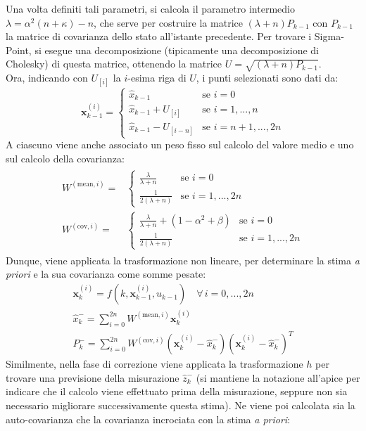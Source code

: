 \documentclass[12pt,a4paper,openright,twoside]{book}
\begin{document}
Una volta definiti tali parametri, si calcola il parametro intermedio $\lambda=\alpha^2(n+\kappa)-n$, che serve per costruire la matrice $(\lambda+n)P_{k-1}$ con $P_{k-1}$ la matrice di covarianza dello stato all'istante precedente. Per trovare i Sigma-Point, si esegue una decomposizione (tipicamente una decomposizione di Cholesky) di questa matrice, ottenendo la matrice $U=\sqrt{(\lambda+n)P_{k-1}}$. \\
Ora, indicando con $U_{[i]}$ la $i$-esima riga di $U$, i punti selezionati sono dati da:
\begin{equation*}
\mathbf{x}_{k-1}^{(i)}=\begin{cases}
\hat{x}_{k-1} & \text{se }i=0 \\
\hat{x}_{k-1}+U_{[i]} & \text{se }i=1,...,n \\
\hat{x}_{k-1}-U_{[i-n]} & \text{se }i=n+1,...,2n
\end{cases}
\end{equation*}
A ciascuno viene anche associato un peso fisso sul calcolo del valore medio e uno sul calcolo della covarianza:
\begin{gather*}
\begin{aligned}
W^{(\text{mean},i)}=&\begin{cases}
\frac{\lambda}{\lambda+n} & \text{se }i=0 \\
\frac{1}{2(\lambda+n)} & \text{se }i=1,...,2n
\end{cases} \\
W^{(\text{cov},i)}=&\begin{cases}
\frac{\lambda}{\lambda+n}+(1-\alpha^2+\beta) & \text{se }i=0 \\
\frac{1}{2(\lambda+n)} & \text{se }i=1,...,2n
\end{cases}
\end{aligned}
\end{gather*}
Dunque, viene applicata la trasformazione non lineare, per determinare la stima \textit{a priori} e la sua covarianza come somme pesate:
\begin{gather*}
\mathbf{x}_k^{(i)}=f(k,\mathbf{x}_{k-1}^{(i)},u_{k-1})\quad\forall\,i=0,...,2n \\
\hat{x}_k^-=\sum_{i=0}^{2n}W^{(\text{mean},i)}\mathbf{x}_k^{(i)} \\
P_k^-=\sum_{i=0}^{2n}W^{(\text{cov},i)}\left(\mathbf{x}_k^{(i)}-\hat{x}_k^-\right)\left(\mathbf{x}_k^{(i)}-\hat{x}_k^-\right)^T
\end{gather*}
Similmente, nella fase di correzione viene applicata la trasformazione $h$ per trovare una previsione della misurazione $\hat{z}_k^-$ (si mantiene la notazione all'apice per indicare che il calcolo viene effettuato prima della misurazione, seppure non sia necessario migliorare successivamente questa stima). Ne viene poi calcolata sia la auto-covarianza che la covarianza incrociata con la stima \textit{a priori}:
\end{document}
